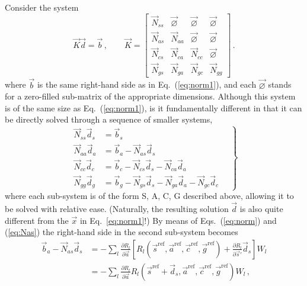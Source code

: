 \documentclass[structabstract]{aa}
\begin{document}
Consider the system
\begin{equation}\label{eq:precond}
\vec{K}\vec{d}=\vec{b}\, , \qquad \vec{K} =
    \begin{bmatrix}
        \vec{N}_{ss} & \vec{\varnothing} & \vec{\varnothing} & \vec{\varnothing} \\
        \vec{N}_{as} & \vec{N}_{aa}      & \vec{\varnothing} & \vec{\varnothing} \\
        \vec{N}_{cs} & \vec{N}_{ca}      & \vec{N}_{cc}      & \vec{\varnothing} \\
        \vec{N}_{gs} & \vec{N}_{ga}      & \vec{N}_{gc}      & \vec{N}_{gg}
    \end{bmatrix} \, .
\end{equation}
where $\vec{b}$ is the same right-hand side as in Eq.~(\ref{eq:norm1}), 
and each $\vec{\varnothing}$ stands for a zero-filled sub-matrix of the
appropriate dimensions. Although this system is of the same size as
Eq.~(\ref{eq:norm1}), is it fundamentally different in that it can be directly solved
through a sequence of smaller systems,
\begin{equation}\label{eq:precond1}
\left.
\begin{aligned}
\vec{N}_{ss}\vec{d}_s &= \vec{b}_s \\
\vec{N}_{aa}\vec{d}_a &= \vec{b}_a-\vec{N}_{as}\vec{d}_s \\
\vec{N}_{cc}\vec{d}_c &= \vec{b}_c-\vec{N}_{cs}\vec{d}_s-\vec{N}_{ca}\vec{d}_a \\
\vec{N}_{gg}\vec{d}_g &= 
\vec{b}_g-\vec{N}_{gs}\vec{d}_s-\vec{N}_{ga}\vec{d}_a-\vec{N}_{gc}\vec{d}_c
\quad
\end{aligned}
\right\} 
\end{equation}
where each sub-system is of the form S, A, C, G described above, allowing it
to be solved with relative ease. (Naturally, the resulting solution $\vec{d}$
is also quite different from the $\vec{x}$ in Eq.~\ref{eq:norm1}!) 
By means of Eqs.~(\ref{eq:norm})
and (\ref{eq:Nas}) the right-hand side in the second sub-system becomes
\begin{align}
\vec{b}_a-\vec{N}_{as}\vec{d}_s &= -\sum_l \frac{\partial R_l}{\partial\vec{a}}
\left[ R_l(\vec{s}^\text{ref},\vec{a}^\text{ref},\vec{c}^\text{ref},\vec{g}^\text{ref})
+\frac{\partial R_l}{\partial\vec{s}'}\vec{d}_s\right]W_l \nonumber \\
&= -\sum_l \frac{\partial R_l}{\partial\vec{a}}
R_l(\vec{s}^\text{ref}+\vec{d}_s,\vec{a}^\text{ref},\vec{c}^\text{ref},\vec{g}^\text{ref})W_l
\, ,\label{eq:precond2}
\end{align}
\end{document}

